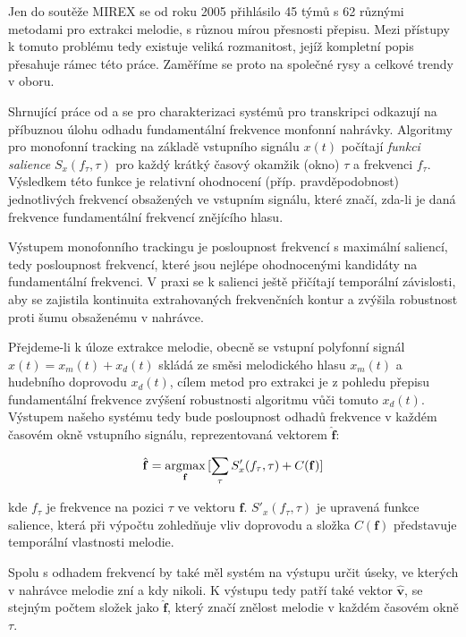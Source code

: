 Jen do soutěže MIREX se od roku 2005 přihlásilo 45 týmů s 62 různými metodami pro extrakci melodie, s různou mírou přesnosti přepisu. Mezi přístupy k tomuto problému tedy existuje veliká rozmanitost, jejíž kompletní popis přesahuje rámec této práce. Zaměříme se proto na společné rysy a celkové trendy v oboru. 

Shrnující práce od \cite{Poliner2007} a \cite{Salamon2014} se pro charakterizaci systémů pro transkripci odkazují na příbuznou úlohu odhadu fundamentální frekvence monfonní nahrávky. Algoritmy pro monofonní tracking na základě vstupního signálu $x(t)$ počítají \textit{funkci salience} $S_x(f_\tau, \tau)$ pro každý krátký časový okamžik (okno) $\tau$ a frekvenci $f_\tau$. Výsledkem této funkce je relativní ohodnocení (příp. pravděpodobnost) jednotlivých frekvencí obsažených ve vstupním signálu, které značí, zda-li je daná frekvence fundamentální frekvencí znějícího hlasu. 

Výstupem monofonního trackingu je posloupnost frekvencí s maximální saliencí, tedy posloupnost frekvencí, které jsou nejlépe ohodnocenými kandidáty na fundamentální frekvenci. V praxi se k salienci ještě přičítají temporální závislosti, aby se zajistila kontinuita extrahovaných frekvenčních kontur a zvýšila robustnost proti šumu obsaženému v nahrávce. 

Přejdeme-li k úloze extrakce melodie, obecně se vstupní polyfonní signál $x(t) = x_m(t) + x_d(t)$ skládá ze směsi melodického hlasu $x_m(t)$ a hudebního doprovodu $x_d(t)$, cílem metod pro extrakci je z pohledu přepisu fundamentální frekvence zvýšení robustnosti algoritmu vůči tomuto  $x_d(t)$. Výstupem našeho systému tedy bude posloupnost odhadů frekvence v každém časovém okně vstupního signálu, reprezentovaná vektorem $\hat{\mathbf{f}}$:

    $$\hat{\mathbf{f}} = \argmax_{\mathbf{f}}{[\sum_{\tau}{S'_x(f_\tau, \tau)} + C(\mathbf{f})]}$$

kde $f_\tau$ je frekvence na pozici $\tau$ ve vektoru $\mathbf{f}$. $S'_x(f_\tau, \tau)$ je upravená funkce salience, která při výpočtu zohledňuje vliv doprovodu a složka $C(\mathbf{f})$ představuje temporální vlastnosti melodie. 

Spolu s odhadem frekvencí by také měl systém na výstupu určit úseky, ve kterých v nahrávce melodie zní a kdy nikoli. K výstupu tedy patří také vektor $\hat{\mathbf{v}}$, se stejným počtem složek jako $\hat{\mathbf{f}}$, který značí znělost melodie v každém časovém okně $\tau$.

